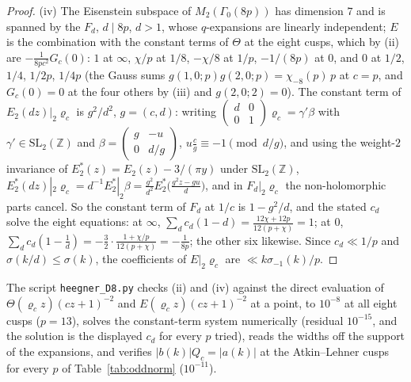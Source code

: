 \documentclass[11pt]{amsart}
\theoremstyle{remark}
\newcommand{\Z}{\mathbb{Z}}
\begin{document}
\begin{proof}
(iv) The Eisenstein subspace of $M_2(\Gamma_0(8p))$ has dimension $7$ and is spanned by the $F_d$, $d\mid8p$, $d>1$, whose $q$-expansions are linearly independent; $E$ is the combination with the constant terms of $\Theta$ at the eight cusps, which by (ii) are $-\frac1{8pc^2}G_c(0)$: $1$ at $\infty$, $\chi/p$ at $1/8$, $-\chi/8$ at $1/p$, $-1/(8p)$ at $0$, and $0$ at $1/2$, $1/4$, $1/2p$, $1/4p$ (the Gauss sums $g(1,0;p)g(2,0;p)=\chi_{-8}(p)\,p$ at $c=p$, and $G_c(0)=0$ at the four others by (iii) and $g(2,0;2)=0$). The constant term of $E_2(dz)|_2\varrho_c$ is $g^2/d^2$, $g=(c,d)$: writing $\left(\begin{smallmatrix}d&0\\0&1\end{smallmatrix}\right)\varrho_c=\gamma'\beta$ with $\gamma'\in\mathrm{SL}_2(\Z)$ and $\beta=\left(\begin{smallmatrix}g&-u\\0&d/g\end{smallmatrix}\right)$, $u\frac cg\equiv-1\pmod{d/g}$, and using the weight-$2$ invariance of $E_2^*(z)=E_2(z)-3/(\pi y)$ under $\mathrm{SL}_2(\Z)$, $E_2^*(dz)|_2\varrho_c=d^{-1}E_2^*|_2\beta=\frac{g^2}{d^2}E_2^*\bigl(\frac{g^2z-gu}d\bigr)$, and in $F_d|_2\varrho_c$ the non-holomorphic parts cancel. So the constant term of $F_d$ at $1/c$ is $1-g^2/d$, and the stated $c_d$ solve the eight equations: at $\infty$, $\sum_dc_d(1-d)=\frac{12\chi+12p}{12(p+\chi)}=1$; at $0$, $\sum_dc_d(1-\frac1d)=-\frac{3}{2}\cdot\frac{1+\chi/p}{12(p+\chi)}=-\frac1{8p}$; the other six likewise. Since $c_d\ll1/p$ and $\sigma(k/d)\le\sigma(k)$, the coefficients of $E|_2\varrho_c$ are $\ll k\sigma_{-1}(k)/p$.
\end{proof}

The script \texttt{heegner\_D8.py} checks (ii) and (iv) against the direct evaluation of $\Theta(\varrho_cz)(cz+1)^{-2}$ and $E(\varrho_cz)(cz+1)^{-2}$ at a point, to $10^{-8}$ at all eight cusps ($p=13$), solves the constant-term system numerically (residual $10^{-15}$, and the solution is the displayed $c_d$ for every $p$ tried), reads the widths off the support of the expansions, and verifies $|b(k)|Q_c=|a(k)|$ at the Atkin--Lehner cusps for every $p$ of Table~\ref{tab:oddnorm} ($10^{-11}$).
\end{document}
